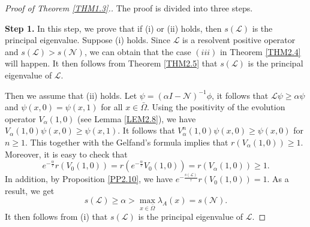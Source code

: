 \documentclass[11pt,reqno]{amsart}
\numberwithin{equation}{section}
\begin{document}
\begin{proof}[Proof of Theorem \ref{THM1.3}.]
The proof is divided into three steps. 

\textbf{Step 1.} In this step, we prove that if (i) or (ii) holds, then $s(\mathcal{L})$ is the principal eigenvalue.
Suppose (i) holds.
Since $\mathcal{L}$ is a resolvent positive operator and $s(\mathcal{L})>s(\mathcal{N})$, we can obtain that the case $(iii)$ in Theorem \ref{THM2.4} will happen.
It then follows from Theorem \ref{THM2.5} that $s(\mathcal{L})$ is the principal eigenvalue of $\mathcal{L}$.


Then we assume that (ii) holds.
Let $\psi=(\alpha I - \mathcal{N})^{-1}\phi$, it follows that $\mathcal{L}\psi\geq\alpha\psi$ and $\psi(x,0)=\psi(x,1)$ for all $x\in\bar{\Omega}$.
Using the positivity of the evolution operator $V_{\alpha}(1,0)$ (see Lemma \ref{LEM2.8}), we have $V_{\alpha}(1,0)\psi(x,0) \geq \psi(x,1)$.
It follows that $V^{n}_{\alpha}(1,0)\psi(x,0)\geq\psi(x,0)$ for $n\geq 1$.
This together with the Gelfand's formula implies that $r(V_{\alpha}(1,0))\geq 1$.
Moreover, it is easy to check that
\begin{equation*}
e^{-\frac{\alpha}{\tau}}r(V_{0}(1,0))=r(e^{-\frac{\alpha}{\tau}}V_{0}(1,0))=r(V_{\alpha}(1,0))\geq 1.
\end{equation*}
In addition, by Proposition \ref{PP2.10}, we have
$e^{- \frac{s(\mathcal{L})}{\tau} } r(V_{0}(1,0))=1$. As a result, we get
\begin{equation*}
s(\mathcal{L})\geq \alpha >  \max_{x\in\bar{\Omega}} \lambda_{A}(x) = s(\mathcal{N}).
\end{equation*}
It then follows from (i) that $s(\mathcal{L})$ is the principal eigenvalue of $\mathcal{L}$.



\end{proof}
\end{document}
